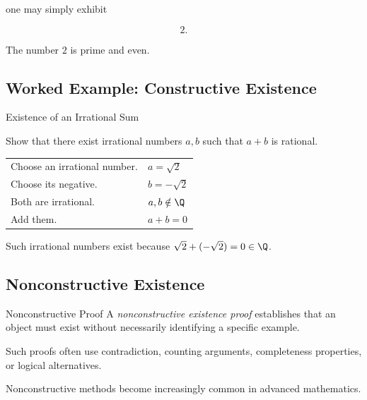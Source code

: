 one may simply exhibit

\[ 2. \]

The number \(2\) is prime and even.

\subsection{Worked Example: Constructive Existence}
\label{subsec:worked-constructive-existence}

\begin{workedexamplebox}{Existence of an Irrational Sum}

Show that there exist irrational numbers \(a,b\) such that \(a+b\) is rational.

\begin{tabularx}{\textwidth}{@{}>{\raggedright\arraybackslash}p{}X@{}}
Choose an irrational number. & \(a=\sqrt2\)\\
Choose its negative. & \(b=-\sqrt2\)\\
Both are irrational. & \(a,b\notin\Q\)\\
Add them. & \(a+b=0\)
\end{tabularx}

\begin{answerbox}
Such irrational numbers exist because \(\sqrt2+(-\sqrt2)=0\in\Q\).
\end{answerbox}
\end{workedexamplebox}

\subsection{Nonconstructive Existence}
\label{subsec:nonconstructive-existence}

\begin{definitionbox}{Nonconstructive Proof}
A \emph{nonconstructive existence proof} establishes that an object must
exist without necessarily identifying a specific example.
\end{definitionbox}

Such proofs often use contradiction, counting arguments, completeness
properties, or logical alternatives.

Nonconstructive methods become increasingly common in advanced mathematics.

